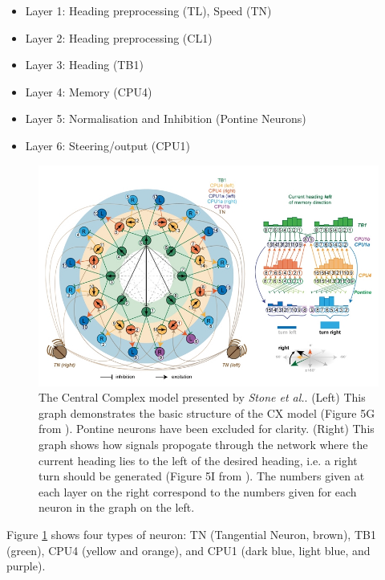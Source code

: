 \documentclass[a4paper,11pt,twoside,openright]{article}
\begin{document}
\begin{itemize}
\item{Layer 1: Heading preprocessing (TL), Speed (TN)}
\item{Layer 2: Heading preprocessing (CL1)}
\item{Layer 3: Heading (TB1)}
\item{Layer 4: Memory (CPU4)}
\item{Layer 5: Normalisation and Inhibition (Pontine Neurons)}
\item{Layer 6: Steering/output (CPU1)}
\end{itemize}

\begin{figure}[h!]
  \centering
  \includegraphics[width=\textwidth]{StoneCXModel}
  \caption{\label{fig:cx} The Central Complex model presented by
    \textit{Stone et al.}. (Left) This graph demonstrates the basic structure of
    the CX model (Figure 5G from \cite{Stone2017}). Pontine neurons have been
    excluded for clarity.
    (Right) This graph shows how signals propogate through the network where the
    current heading lies to the left of the desired heading, i.e. a right turn
    should be generated (Figure 5I from \cite{Stone2017}). The numbers given at
    each layer on the right correspond to the numbers given for each neuron
    in the graph on the left.
  }
\end{figure}

Figure \ref{fig:cx} shows four types of neuron: TN (Tangential Neuron,
brown), TB1 (green), CPU4 (yellow and orange), and CPU1 (dark blue,
light blue, and purple).
\newline
\par
\end{document}
